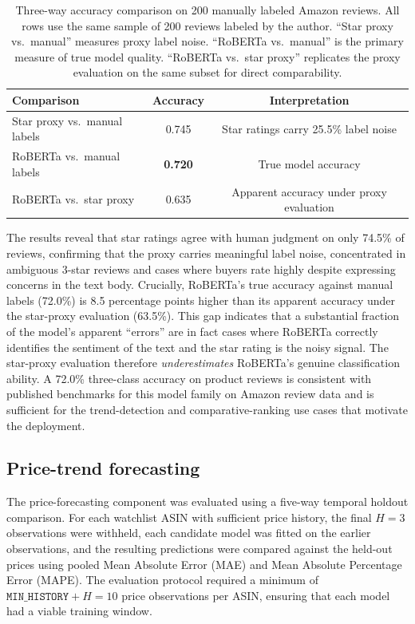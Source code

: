 \begin{table}[H]
  \centering
  \begin{tabular}{lcc}
    \toprule
    \textbf{Comparison} & \textbf{Accuracy} & \textbf{Interpretation} \\
    \midrule
    Star proxy vs.\ manual labels  & 0.745 & Star ratings carry 25.5\% label noise \\
    RoBERTa vs.\ manual labels     & \textbf{0.720} & True model accuracy \\
    RoBERTa vs.\ star proxy        & 0.635 & Apparent accuracy under proxy evaluation \\
    \bottomrule
  \end{tabular}
  \caption{Three-way accuracy comparison on 200 manually labeled Amazon reviews.
  All rows use the same sample of 200 reviews labeled by the author.
  ``Star proxy vs.\ manual'' measures proxy label noise.
  ``RoBERTa vs.\ manual'' is the primary measure of true model quality.
  ``RoBERTa vs.\ star proxy'' replicates the proxy evaluation on the same
  subset for direct comparability.}
  \label{tab:manual_label_eval}
\end{table}

The results reveal that star ratings agree with human judgment on only 74.5\% of
reviews, confirming that the proxy carries meaningful label noise, concentrated
in ambiguous 3-star reviews and cases where buyers rate highly despite expressing
concerns in the text body. Crucially, RoBERTa's true accuracy against manual
labels (72.0\%) is 8.5 percentage points higher than its apparent accuracy under
the star-proxy evaluation (63.5\%). This gap indicates that a substantial fraction
of the model's apparent ``errors'' are in fact cases where RoBERTa correctly
identifies the sentiment of the text and the star rating is the noisy signal.
The star-proxy evaluation therefore \emph{underestimates} RoBERTa's genuine
classification ability. A 72.0\% three-class accuracy on product reviews is
consistent with published benchmarks for this model family on Amazon review data
\citep{barbieri2020tweeteval} and is sufficient for the trend-detection and
comparative-ranking use cases that motivate the deployment.

\subsection{Price-trend forecasting}

The price-forecasting component was evaluated using a five-way temporal holdout comparison. For each watchlist ASIN with sufficient price history, the final $H = 3$ observations were withheld, each candidate model was fitted on the earlier observations, and the resulting predictions were compared against the held-out prices using pooled Mean Absolute Error (MAE) and Mean Absolute Percentage Error (MAPE). The evaluation protocol required a minimum of $\texttt{MIN\_HISTORY} + H = 10$ price observations per ASIN, ensuring that each model had a viable training window.

